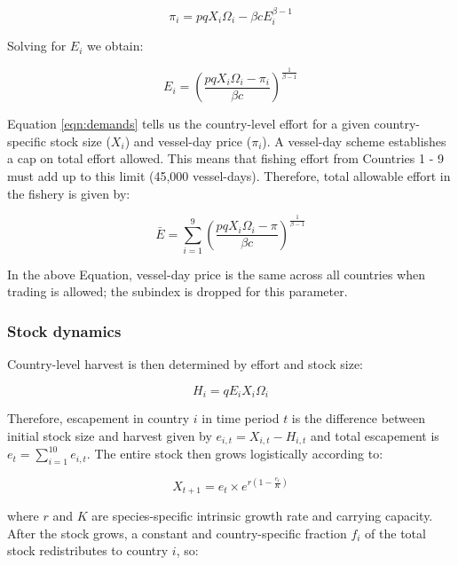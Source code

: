 \documentclass[12pt]{article}
\begin{document}
$$
\pi_i = pqX_i\Omega_i - \beta c E_i ^{\beta - 1}
$$

\noindent Solving for $E_i$ we obtain:

\begin{equation}
E_i = \left(\frac{pqX_i\Omega_i - \pi_i}{\beta c }\right) ^ {\frac{1}{\beta - 1}}
\label{eqn:demands}
\end{equation}

Equation \ref{eqn:demands} tells us the country-level effort for a given country-specific stock size ($X_i$) and vessel-day price ($\pi_i$). A vessel-day scheme establishes a cap on total effort allowed. This means that fishing effort from Countries 1 - 9 must add up to this limit (45,000 vessel-days). Therefore, total allowable effort in the fishery is given by:

\begin{equation}
\bar{E} = \sum_{i = 1}^9\left(\frac{pqX_i\Omega_i - \pi}{\beta c }\right) ^ {\frac{1}{\beta - 1}}
\label{eqn:Ebar}
\end{equation}

\noindent In the above Equation, vessel-day price is the same across all countries when trading is allowed; the subindex is dropped for this parameter.

\subsubsection{Stock dynamics}

Country-level harvest is then determined by effort and stock size:

\begin{equation}
H_i = qE_iX_i\Omega_i
\label{eqn:harvest}
\end{equation}


\noindent Therefore, escapement in country $i$ in time period $t$ is the difference between initial stock size and harvest given by $e_{i,t} = X_{i,t} - H_{i,t}$ and total escapement is $e_t=\sum_{i=1}^{10}e_{i,t}$. The entire stock then grows logistically according to:

\begin{equation}
X_{t+1} = e_t \times  e^{r \left(1 - \frac{e_t}{K} \right)}
\label{eqn:grow}
\end{equation}

\noindent where $r$ and $K$ are species-specific intrinsic growth rate and carrying capacity. After the stock grows, a constant and country-specific fraction $f_i$ of the total stock redistributes to country $i$, so:
\end{document}

